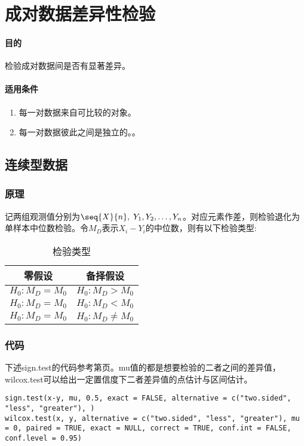 \section{成对数据差异性检验}

\paragraph{目的}
检验成对数据间是否有显著差异。
\paragraph{适用条件}
\begin{enumerate}
	\item 每一对数据来自可比较的对象。
	\item 每一对数据彼此之间是独立的。。
\end{enumerate}

\subsection{连续型数据}
\subsubsection{原理}
记两组观测值分别为$\seq{X}{n},\;Y_1,Y_2,\dots,Y_n$。对应元素作差，则检验退化为单样本中位数检验。令$M_D$表示$X_i-Y_i$的中位数，则有以下检验类型:

\begin{table}[htbp]
	\centering
	\begin{tabular}{cc}
		\toprule
		零假设 & 备择假设 \\
		\midrule 
		$H_0:M_D=M_0$ & $H_0:M_D>M_0$ \\
		$H_0:M_D=M_0$ & $H_0:M_D<M_0$ \\
		$H_0:M_D=M_0$ & $H_0:M_D\ne M_0$ \\
		\bottomrule 
	\end{tabular}
	\caption{检验类型}
\end{table}

\subsubsection{代码}
下述sign.test的代码参考第\pageref{sec:sign.test.code}页。mu值的都是想要检验的二者之间的差异值，wilcox.test可以给出一定置信度下二者差异值的点估计与区间估计。
\begin{verbatim}
sign.test(x-y, mu, 0.5, exact = FALSE, alternative = c("two.sided", "less", "greater"), )
wilcox.test(x, y, alternative = c("two.sided", "less", "greater"), mu = 0, paired = TRUE, exact = NULL, correct = TRUE, conf.int = FALSE, conf.level = 0.95)
\end{verbatim}

